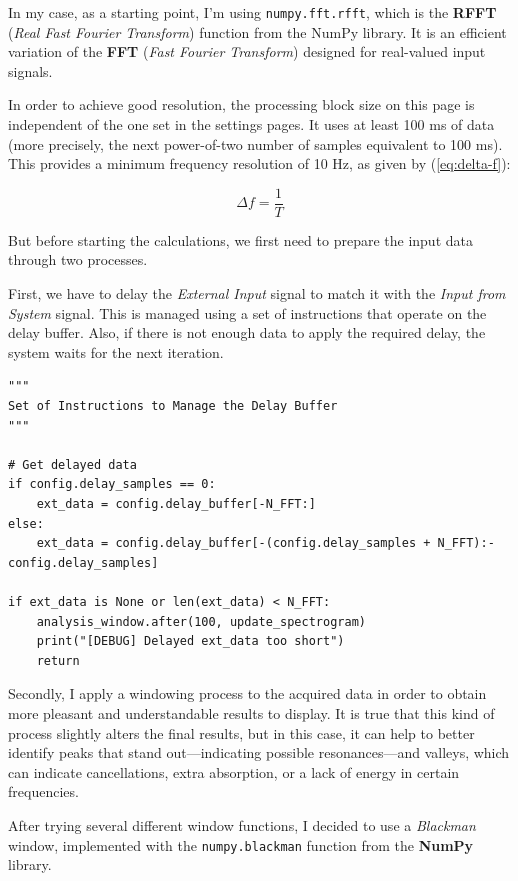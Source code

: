 In my case, as a starting point, I’m using \texttt{numpy.fft.rfft}, which is the \textbf{RFFT} (\textit{Real Fast Fourier Transform}) function from the NumPy library. It is an efficient variation of the \textbf{FFT} (\textit{Fast Fourier Transform}) designed for real-valued input signals.

In order to achieve good resolution, the processing block size on this page is independent of the one set in the settings pages. It uses at least 100 ms of data (more precisely, the next power-of-two number of samples equivalent to 100 ms). This provides a minimum frequency resolution of 10 Hz, as given by
(\ref{eq:delta-f}):

\begin{equation}
	\label{eq:delta-f}
	\Delta f = \frac{1}{T}
\end{equation}

But before starting the calculations, we first need to prepare the input data through two processes.

First, we have to delay the \textit{External Input} signal to match it with the \textit{Input from System} signal. This is managed using a set of instructions that operate on the delay buffer. Also, if there is not enough data to apply the required delay, the system waits for the next iteration.

\begin{verbatim}
"""
Set of Instructions to Manage the Delay Buffer
"""

# Get delayed data
if config.delay_samples == 0:
	ext_data = config.delay_buffer[-N_FFT:]
else:
	ext_data = config.delay_buffer[-(config.delay_samples + N_FFT):-config.delay_samples]

if ext_data is None or len(ext_data) < N_FFT:
	analysis_window.after(100, update_spectrogram)
	print("[DEBUG] Delayed ext_data too short")
	return	
\end{verbatim}

Secondly, I apply a windowing process to the acquired data in order to obtain more pleasant and understandable results to display. It is true that this kind of process slightly alters the final results, but in this case, it can help to better identify peaks that stand out—indicating possible resonances—and valleys, which can indicate cancellations, extra absorption, or a lack of energy in certain frequencies.

After trying several different window functions, I decided to use a \textit{Blackman} window, implemented with the \texttt{numpy.blackman} function from the \textbf{NumPy} library.

